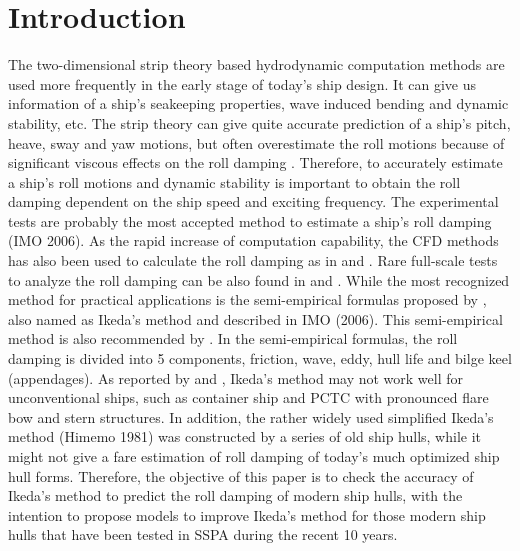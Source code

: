 \section{Introduction}
\label{se:introduction}

%    

The two-dimensional strip theory based hydrodynamic computation methods are used more frequently in the early stage of today's ship design. It can give us information of a ship's seakeeping properties, wave induced bending and dynamic stability, etc. The strip theory can give quite accurate prediction of a ship's pitch, heave, sway and yaw motions, but often overestimate the roll motions because of significant viscous effects on the roll damping \parencite{kawahara_simple_2011}. Therefore, to accurately estimate a ship's roll motions and dynamic stability is important to obtain the roll damping dependent on the ship speed and exciting frequency. The experimental tests are probably the most accepted method to estimate a ship's roll damping (IMO 2006). As the rapid increase of computation capability, the CFD methods has also been used to calculate the roll damping as in \parencite{kristiansen_experimental_2014} and \parencite{henry_peter_piehl_ship_nodate}. Rare full-scale tests to analyze the roll damping can be also found in \parencite{schmitke_ship_1978} and \parencite{soder_assessment_2019}. While the most recognized method for practical applications is the semi-empirical formulas proposed by  \parencite{ikeda_eddy_1978,ikeda_components_1978,ikeda_roll_1979,ikeda_velocity_1979}, also named as Ikeda's method and described in IMO (2006). This semi-empirical method is also recommended by \parencite{ittc_ittc_2011}. In the semi-empirical formulas, the roll damping is divided into 5 components, friction, wave, eddy, hull life and bilge keel (appendages). As reported by  \parencite{kawahara_simple_2011} and \parencite{soder_ikeda_2019}, Ikeda's method may not work well for unconventional ships, such as container ship and PCTC with pronounced flare bow and stern structures. In addition, the rather widely used simplified Ikeda's method (Himemo 1981) was constructed by a series of old ship hulls, while it might not give a fare estimation of roll damping of today's much optimized ship hull forms. Therefore, the objective of this paper is to check the accuracy of Ikeda's method to predict the roll damping of modern ship hulls, with the intention to propose models to improve Ikeda's method for those modern ship hulls that have been tested in SSPA during the recent 10 years.

